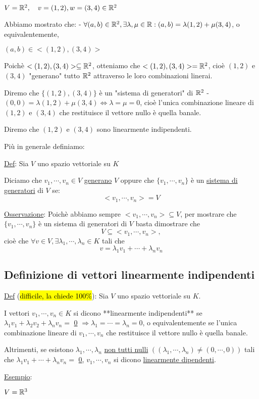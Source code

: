 \documentclass{article}
\begin{document}
$V=\mathbb{R}^2,\quad v=(1,2),w=(3,4)\in\mathbb{R}^2$

Abbiamo mostrato che:
- $\forall(a,b)\in\mathbb{R}^2,\exists\lambda,\mu\in\mathbb{R}:(a,b)=\lambda(1,2)+\mu(3,4)$, o equivalentemente,

  $(a,b)\in<(1,2),(3,4)>$

  Poichè $<(1,2),(3,4)>\subseteq\mathbb{R}^2$, otteniamo che $<(1,2),(3,4)>=\mathbb{R}^2$, cioè $(1,2)$ e $(3,4)$ "generano" tutto $\mathbb{R}^2$ attraverso le loro combinazioni linerai.

  Diremo che $\{(1,2),(3,4)\}$ è un "sistema di generatori" di $\mathbb{R}^2$
- $(0,0)=\lambda(1,2)+\mu(3,4)\Leftrightarrow\lambda=\mu=0$, cioè l'unica combinazione lineare di $(1,2)$ e $(3,4)$ che restituisce il vettore nullo è quella banale.

  Diremo che $(1,2)$ e $(3,4)$ sono linearmente indipendenti.

Più in generale definiamo:

\ul{Def}: Sia $V$ uno spazio vettoriale su $K$

Diciamo che $v_1,\cdots,v_n\in V$ \ul{generano} $V$ oppure che $\{v_1,\cdots,v_n\}$ è un \ul{sistema di generatori} di $V$ se:
$$<v_1,\cdots,v_n>=V$$

\ul{Osservazione}: Poichè abbiamo sempre $<v_1,\cdots,v_n>\subseteq V$, per mostrare che $\{v_1,\cdots,v_n\}$ è un sistema di generatori di $V$ basta dimostrare che
$$V\subseteq<v_1,\cdots,v_n>,$$
cioè che $\forall v\in V,\exists\lambda_1,\cdots,\lambda_n\in K$ tali che
$$v=\lambda_1v_1+\cdots+\lambda_nv_n$$

\subsection{Definizione di vettori linearmente indipendenti}
\ul{Def} (\hl{difficile, la chiede 100\%}): Sia $V$ uno spazio vettoriale su $K$.

I vettori $v_1,\cdots,v_n\in K$ si dicono **linearmente indipendenti** se
$\lambda_1v_1+\lambda_2v_2+\lambda_nv_n=$ \ul{0} $\Rightarrow\lambda_1=\cdots=\lambda_n=0$, o equivalentemente se l'unica combinazione lineare di $v_1,\cdots,v_n$ che restituisce il vettore nullo è quella banale.

Altrimenti, se esistono $\lambda_1,\cdots,\lambda_n$ \ul{non tutti nulli} $((\lambda_1,\cdots,\lambda_n)\not=(0,\cdots,0))$ tali che $\lambda_1v_1+\cdots+\lambda_nv_n=$ \ul{0}, $v_1,\cdots,v_n$ si dicono \ul{linearmente dipendenti}.

\ul{Esempio}:

$V=\mathbb{R}^3$
\end{document}
